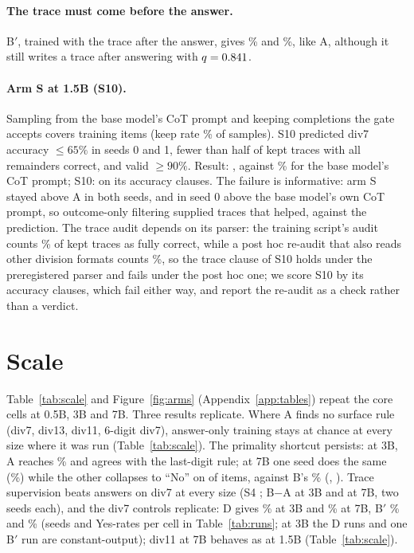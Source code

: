 \documentclass{article}
\theoremstyle{definition}
\begin{document}
\paragraph{The trace must come before the answer.} B$'$, trained with the trace after the answer, gives \divsevenBpsZero\% and \divsevenBpsOne\%, like A, although it still writes a trace after answering with $q=0.841$.

\paragraph{Arm S at 1.5B (S10).} Sampling from the base model's CoT prompt and keeping completions the gate accepts covers \selfKept{} training items (keep rate \selfKeep\% of samples). S10 predicted div7 accuracy $\le 65\%$ in seeds 0 and 1, fewer than half of kept traces with all remainders correct, and valid $\ge 90\%$. Result: \STenResult, against \divsevenCot\% for the base model's CoT prompt; S10: \verdictSTen{} on its accuracy clauses. The failure is informative: arm S stayed above A in both seeds, and in seed 0 above the base model's own CoT prompt, so outcome-only filtering supplied traces that helped, against the prediction. The trace audit depends on its parser: the training script's audit counts \selfCorrectAll\% of kept traces as fully correct, while a post hoc re-audit that also reads other division formats counts \selfCorrectAllExt\%, so the trace clause of S10 holds under the preregistered parser and fails under the post hoc one; we score S10 by its accuracy clauses, which fail either way, and report the re-audit as a check rather than a verdict.


\section{Scale}
\label{sec:scale}
Table~\ref{tab:scale} and Figure~\ref{fig:arms} (Appendix~\ref{app:tables}) repeat the core cells at 0.5B, 3B and 7B. Three results replicate. Where A finds no surface rule (div7, div13, div11, 6-digit div7), answer-only training stays at chance at every size where it was run (Table~\ref{tab:scale}). The primality shortcut persists: at 3B, A reaches \threeBprimeA\% and agrees with the last-digit rule; at 7B one seed does the same (\sevenBprimeAsOne\%) while the other collapses to ``No'' on \sevenBprimeAsZeroNo{} of \nTest{} items, against B's \sevenBprimeB\% (\sevenBprimeBsZero, \sevenBprimeBsOne). Trace supervision beats answers on div7 at every size (S4 \verdictSFour; B$-$A \threeBdivsevenBootBADiff{} \threeBdivsevenBootBACi{} at 3B and \sevenBdivsevenBootBADiff{} \sevenBdivsevenBootBACi{} at 7B, two seeds each), and the div7 controls replicate: D gives \threeBdivsevenD\% at 3B and \sevenBdivsevenD\% at 7B, B$'$ \threeBdivsevenBp\% and \sevenBdivsevenBp\% (seeds and Yes-rates per cell in Table~\ref{tab:runs}; at 3B the D runs and one B$'$ run are constant-output); div11 at 7B behaves as at 1.5B (Table~\ref{tab:scale}).
\end{document}
